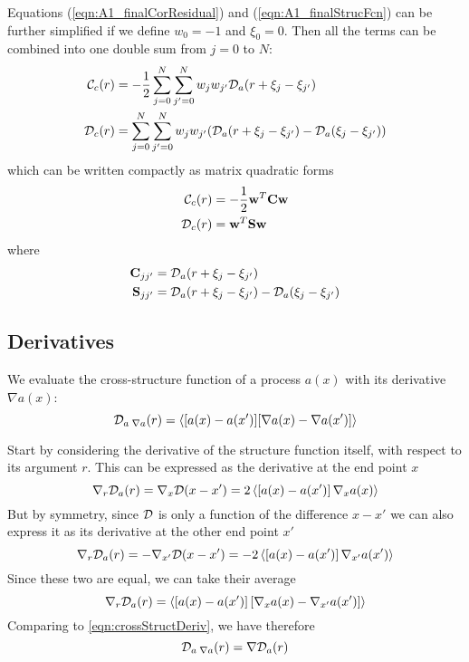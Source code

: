 \documentclass[11pt, oneside]{article}   	%
\begin{document}
\begin{appendix}
Equations (\ref{eqn:A1_finalCorResidual}) and (\ref{eqn:A1_finalStrucFcn}) can be further simplified if we define $w_0 = -1$ and $\xi_0 = 0$. Then all the terms can be combined into one double sum from $j=0$ to $N$:
\begin{align}
{\cal C}_c(r) &= -\frac{1}{2} \sum_{j=0}^N \sum_{j'=0}^N w_j w_{j'} {\cal D}_a(r+\xi_j - \xi_{j'}) \\
{\cal D}_c(r) &= \sum_{j=0}^N \sum_{j'=0}^N w_j w_{j'} ({\cal D}_a(r+\xi_j - \xi_{j'})-{\cal D}_a(\xi_j - \xi_{j'})) 
\end{align}
which can be written compactly as matrix quadratic forms
\begin{align}
{\cal C}_c(r) &= -\frac{1}{2} {\bf w}^T  {\bf C} {\bf w} \\
{\cal D}_c(r) &= {\bf w}^T {\bf S} {\bf w}
\end{align}
where
\begin{align}
{\bf C}_{jj'} &= {\cal D}_a(r+\xi_j - \xi_{j'}) \\
{\bf S}_{jj'} &= {\cal D}_a(r+\xi_j - \xi_{j'})-{\cal D}_a(\xi_j - \xi_{j'})
\end{align}
\subsection{Derivatives}
\label{append:deriv}
We evaluate the cross-structure function of a process $a(x)$ with its derivative $\nabla a(x)$:
\begin{equation}
\label{eqn:crossStructDeriv}
{\cal D}_{a \;\nabla a}(r) = \left< \left [ a(x) - a(x') ] [ \nabla a(x) - \nabla a(x') \right] \right>
\end{equation}

Start by considering the derivative of the structure function itself, with respect to its argument $r$. This can be expressed as the derivative at the end point $x$
\begin{equation}
\nabla_r{\cal D}_a(r) = \nabla_x {\cal D}(x-x') = 2\left<\left[ a(x)-a(x') \right]\nabla_x a(x)\right>
\end{equation}
But by symmetry, since ${\cal D}$ is only a function of the difference $x-x'$ we can also express it as its derivative at the other end point $x'$
\begin{equation}
\nabla_r{\cal D}_a(r) = -\nabla_{x'} {\cal D}(x-x') = -2\left<\left[ a(x)-a(x') \right]\nabla_{x'} a(x')\right>
\end{equation}
Since these two are equal, we can take their average
\begin{equation}
\nabla_r{\cal D}_a(r) = \left<\left[a(x)-a(x')\right]\left[\nabla_x a(x) - \nabla_{x'} a(x')\right]\right>
\end{equation}
Comparing to \ref{eqn:crossStructDeriv}, we have therefore
\begin{equation}
\label{eqn:derivSF}
{\cal D}_{a \;\nabla a}(r) = \nabla {\cal D}_a(r)
\end{equation}


\end{appendix}
\end{document}
